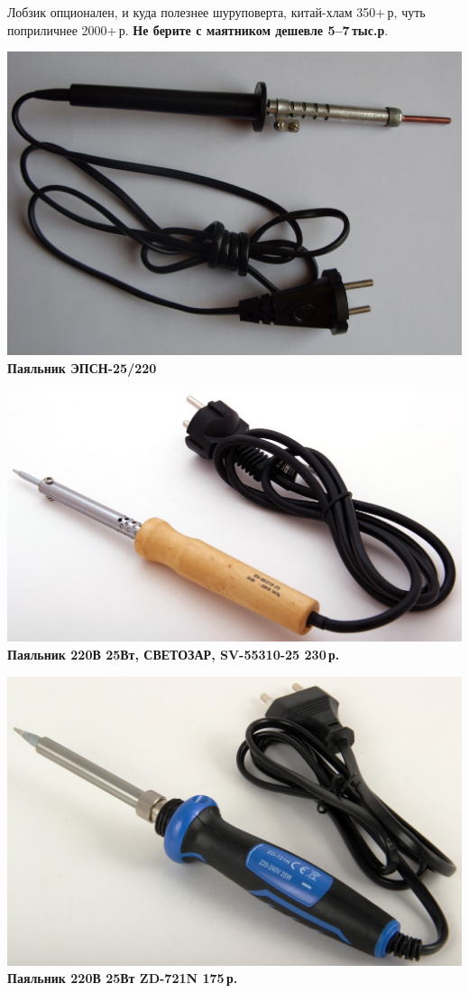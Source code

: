 \documentclass{magazine}
\begin{document}
{Лобзик опционален, и куда полезнее шуруповерта, китай-хлам 
350+\,р, чуть поприличнее 2000+\,р. 
\textbf{Не берите с маятником дешевле 5--7\,тыс.р}.

\noindent\includegraphics[width=\columnwidth]{fig/00/EPSN25.jpg}
\textbf{Паяльник ЭПСН-25/220}

\noindent\href{http://voltmaster-samara.ru/catalog/product/00067650/}{
\includegraphics[width=\columnwidth]{fig/00/SV-55310-25.jpg}}
\textbf{Паяльник 220В 25Вт, СВЕТОЗАР, SV-55310-25 230\,р.}

\noindent\href{http://voltmaster-samara.ru/catalog/product/00091478/}{
\includegraphics[width=\columnwidth]{fig/00/ZD-721N.jpg}}
\textbf{Паяльник 220В 25Вт ZD-721N 175\,р.}

}
\end{document}
